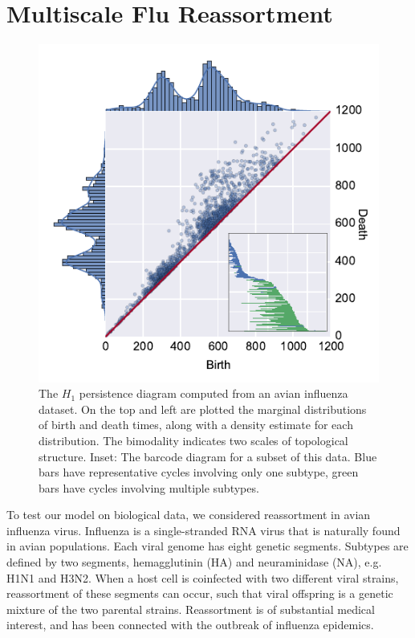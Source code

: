 \section{Multiscale Flu Reassortment}

\begin{figure}
\begin{center}
\centerline{\includegraphics[width=\columnwidth]{./fig/flu_scatterplot.pdf}}
\caption[$H_1$ persistence diagram computed from an avian influenza dataset.]{The $H_1$ persistence diagram computed from an avian influenza dataset. On the top and left are plotted the marginal distributions of birth and death times, along with a density estimate for each distribution. The bimodality indicates two scales of topological structure. Inset: The barcode diagram for a subset of this data. Blue bars have representative cycles involving only one subtype, green bars have cycles involving multiple subtypes.}
\label{fig:flu_scatterplot}
\end{center}
\end{figure}

To test our model on biological data, we considered reassortment in avian influenza virus.
Influenza is a single-stranded RNA virus that is naturally found in avian populations.
Each viral genome has eight genetic segments.
Subtypes are defined by two segments, hemagglutinin (HA) and neuraminidase (NA), e.g. H1N1 and H3N2.
When a host cell is coinfected with two different viral strains, reassortment of these segments can occur, such that viral offspring is a genetic mixture of the two parental strains.
Reassortment is of substantial medical interest, and has been connected with the outbreak of influenza epidemics.

